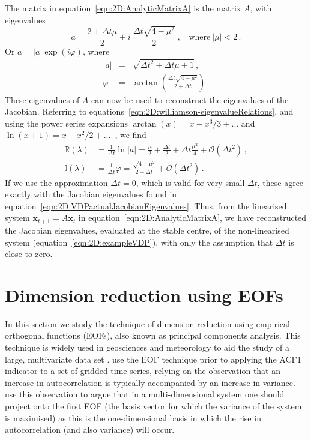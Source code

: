 The matrix in equation~\ref{eqn:2D:AnalyticMatrixA} is the matrix $A$, with eigenvalues 
	\begin{equation}
		a = \frac{2+\Delta t \mu}{2} \pm i~ \frac{\Delta t \sqrt{4-\mu^2}}{2} ~,~~~~\text{where}~|\mu|<2\,.
	\end{equation}
Or $a = |a|\exp(i\varphi)$, where
	\begin{equation}
		\begin{array}{ccc}
		|a| &=& \sqrt{\Delta t^2 + \Delta t \mu +1}\,,\\
		\varphi &=& \arctan\left(\frac{\Delta t \sqrt{4-\mu^2}}{2+\Delta t}\right)\,.
		\end{array}
	\end{equation}
These eigenvalues of $A$ can now be used to reconstruct the eigenvalues of the Jacobian. Referring to equations~\ref{eqn:2D:williamson-eigenvalueRelations}, and using the power series expansions \(\arctan(x) = x - x^3/3 +...\) and \(\ln(x+1) = x-x^2/2+...\)\, , we find
	\begin{align}
		\mathbb{R}(\lambda) &= \frac{1}{\Delta t}\ln|a| = \frac{\mu}{2} + \frac{\Delta t}{2} + \Delta t\frac{\mu^2}{4} + \mathcal{O}(\Delta t^2)\,,\\
		\mathbb{I}(\lambda) &= \frac{1}{\Delta t} \varphi = \frac{\sqrt{4-\mu^2}}{2+\Delta t} + \mathcal{O}(\Delta t^2)\,.
	\label{eqn:2D:EstimatedLambdaVDP}
	\end{align}
If we use the approximation $\Delta t =0$, which is valid for very small $\Delta t$, these agree exactly with the Jacobian eigenvalues found in equation~\ref{eqn:2D:VDPactualJacobianEigenvalues}. Thus, from the linearised system $\mathbf{x}_{t+1}=A\mathbf{x}_t$ in equation~\ref{eqn:2D:AnalyticMatrixA}, we have reconstructed the Jacobian eigenvalues, evaluated at the stable centre, of the non-linearised system (equation~\ref{eqn:2D:exampleVDP}), with only the assumption that $\Delta t$ is close to zero. 


\section{Dimension reduction using EOFs}
\label{sec:2D:EOF}

In this section we study the technique of dimension reduction using empirical orthogonal functions (EOFs), also known as principal components analysis. This technique is widely used in geosciences and meteorology to aid the study of a large, multivariate data set \citep{bjornsson1997,stephenson2000}. \citet{held2004} use the EOF technique prior to applying the ACF1 indicator to a set of gridded time series, relying on the observation that an increase in autocorrelation is typically accompanied by an increase in variance. \citet{held2004} use this observation to argue that in a multi-dimensional system one should project onto the first EOF (the basis vector for which the variance of the system is maximised) as this is the one-dimensional basis in which the rise in autocorrelation (and also variance) will occur. 

